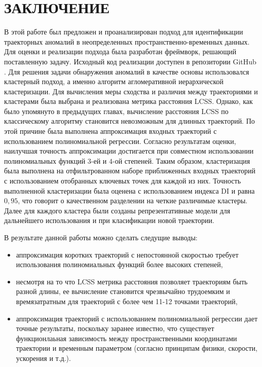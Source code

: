 \chapter{ЗАКЛЮЧЕНИЕ}
\label{ch:ЗАКЛЮЧЕНИЕ}

В этой работе был предложен и проанализирован подход для идентификации траекторных аномалий в неопределенных пространственно-временных данных. Для оценки и реализации подхода была разработан фреймворк, решающий поставленную задачу. Исходный код реализации доступен в репозитории GitHub \cite{online:mt_anomalies}. Для решения задачи обнаружения аномалий в качестве основы использовался кластерный подход, а именно алгоритм агломеративной иерархической кластеризации. Для вычисления меры сходства и различия между траекториями и кластерами была выбрана и реализована метрика расстояния LCSS. Однако, как было упомянуто в предыдущих главах, вычисление расстояния LCSS по классическому алгоритму становится невозможным для длинных траекторий. По этой причине была выполнена аппроксимация входных траекторий с использованием полиномиальной регрессии. Согласно результатам оценки, наилучшая точность аппроксимации достигается при совместном использовании полиномиальных функций $3$-ей и $4$-ой степеней. Таким образом, кластеризация была выполнена на отфильтрованном наборе приближенных входных траекторий с использованием отобранных ключевых точек для каждой из них. Точность выполненной кластеризации была оценена с использованием индекса DI и равна $0,95$, что говорит о качественном разделении на четкие различимые кластеры. Далее для каждого кластера были созданы репрезентативные модели для дальнейшего использования и при класификации новой траектории.

В результате данной работы можно сделать следущие выводы:
\begin{itemize}
	\item аппроксимация коротких траекторий с непостоянной скоростью требует использования полиномиальных функций более высоких степеней,
	\item несмотря на то что LCSS метрика расстояния позволяет траекториям быть разной длины, ее вычисление становится чрезвычайно трудоемким и времязатратным  для траекторий с более чем 11-12 точками траекторий,
	\item аппроксимация траекторий с использованием полиномиальной регрессии дает точные результаты, поскольку заранее известно, что существует функционлаьная зависимость между пространственными координатами траектории и временным параметром (согласно принципам физики, скорости, ускорения и т.д.).
	
\end{itemize}

